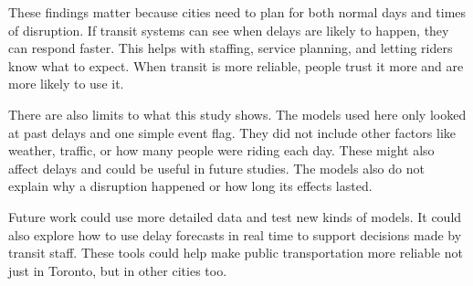 \documentclass[
]{article}
\begin{document}
These findings matter because cities need to plan for both normal days
and times of disruption. If transit systems can see when delays are
likely to happen, they can respond faster. This helps with staffing,
service planning, and letting riders know what to expect. When transit
is more reliable, people trust it more and are more likely to use it.

There are also limits to what this study shows. The models used here
only looked at past delays and one simple event flag. They did not
include other factors like weather, traffic, or how many people were
riding each day. These might also affect delays and could be useful in
future studies. The models also do not explain why a disruption happened
or how long its effects lasted.

Future work could use more detailed data and test new kinds of models.
It could also explore how to use delay forecasts in real time to support
decisions made by transit staff. These tools could help make public
transportation more reliable not just in Toronto, but in other cities
too.
\end{document}

